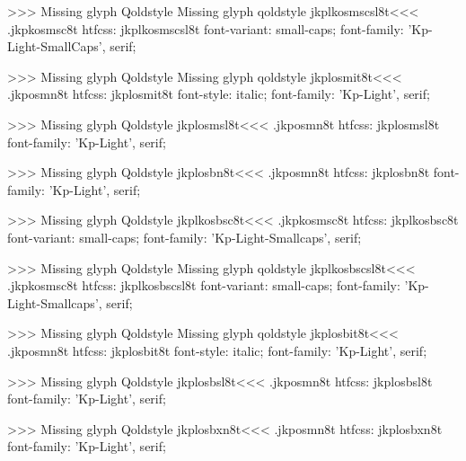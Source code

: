 >>>
Missing glyph	Qoldstyle
Missing glyph	qoldstyle
\<jkplkosmscsl8t\><<<
.jkpkosmsc8t
htfcss:  jkplkosmscsl8t  font-variant: small-caps; font-family: 'Kp-Light-SmallCaps', serif;

>>>
Missing glyph	Qoldstyle
Missing glyph	qoldstyle
\<jkplosmit8t\><<<
.jkposmn8t
htfcss:  jkplosmit8t  font-style: italic; font-family: 'Kp-Light', serif;

>>>
Missing glyph	Qoldstyle
\<jkplosmsl8t\><<<
.jkposmn8t
htfcss:  jkplosmsl8t  font-family: 'Kp-Light', serif;

>>>
Missing glyph	Qoldstyle
\<jkplosbn8t\><<<
.jkposmn8t
htfcss:  jkplosbn8t  font-family: 'Kp-Light', serif;

>>>
Missing glyph	Qoldstyle
\<jkplkosbsc8t\><<<
.jkpkosmsc8t
htfcss:  jkplkosbsc8t  font-variant: small-caps; font-family: 'Kp-Light-Smallcaps', serif;

>>>
Missing glyph	Qoldstyle
Missing glyph	qoldstyle
\<jkplkosbscsl8t\><<<
.jkpkosmsc8t
htfcss:  jkplkosbscsl8t  font-variant: small-caps; font-family: 'Kp-Light-Smallcaps', serif;

>>>
Missing glyph	Qoldstyle
Missing glyph	qoldstyle
\<jkplosbit8t\><<<
.jkposmn8t
htfcss:  jkplosbit8t  font-style: italic; font-family: 'Kp-Light', serif;

>>>
Missing glyph	Qoldstyle
\<jkplosbsl8t\><<<
.jkposmn8t
htfcss:  jkplosbsl8t  font-family: 'Kp-Light', serif;

>>>
Missing glyph	Qoldstyle
\<jkplosbxn8t\><<<
.jkposmn8t
htfcss:  jkplosbxn8t  font-family: 'Kp-Light', serif;

